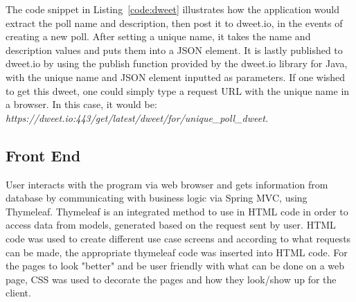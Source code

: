 The code snippet in Listing~\ref{code:dweet} illustrates how the application would extract the poll name and description, then post it to dweet.io, in the events of creating a new poll. After setting a unique name, it takes the name and description values and puts them into a JSON element. It is lastly published to dweet.io by using the publish function provided by the dweet.io library for Java, with the unique name and JSON element inputted as parameters. If one wished to get this dweet, one could simply type a request URL with the unique name in a browser. In this case, it would be: \textit{https://dweet.io:443/get/latest/dweet/for/unique\_poll\_dweet.}


\subsection{Front End}\label{sub:frontend}
User interacts with the program via web browser and gets information from database by communicating with business logic via Spring MVC, using Thymeleaf. Thymeleaf is an integrated method to use in HTML code in order to access data from models, generated based on the request sent by user. HTML code was used to create different use case screens and according to what requests can be made, the appropriate thymeleaf code was inserted into HTML code. For the pages to look "better" and be user friendly with what can be done on a web page, CSS was used to decorate the pages and how they look/show up for the client.